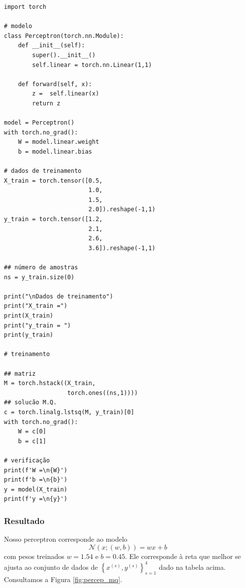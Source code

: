 \begin{lstlisting}[caption=perceptron\_mq.py, label=cap_perceptron_sec_unit:cod:perceptron_mq]
import torch

# modelo
class Perceptron(torch.nn.Module):
    def __init__(self):
        super().__init__()
        self.linear = torch.nn.Linear(1,1)

    def forward(self, x):
        z =  self.linear(x)
        return z

model = Perceptron()
with torch.no_grad():
    W = model.linear.weight
    b = model.linear.bias

# dados de treinamento
X_train = torch.tensor([0.5,
                        1.0,
                        1.5,
                        2.0]).reshape(-1,1)
y_train = torch.tensor([1.2,
                        2.1,
                        2.6,
                        3.6]).reshape(-1,1)

## número de amostras
ns = y_train.size(0)

print("\nDados de treinamento")
print("X_train =")
print(X_train)
print("y_train = ")
print(y_train)

# treinamento

## matriz
M = torch.hstack((X_train,
                  torch.ones((ns,1))))
## solucão M.Q.
c = torch.linalg.lstsq(M, y_train)[0]
with torch.no_grad():
    W = c[0]
    b = c[1]

# verificação
print(f'W =\n{W}')
print(f'b =\n{b}')
y = model(X_train)
print(f'y =\n{y}')
\end{lstlisting}

\subsubsection{Resultado}

Nosso perceptron corresponde ao modelo
\begin{equation}
  \mathcal{N}(x; (w, b)) = wx + b
\end{equation}
com pesos treinados $w = 1.54$ e $b = 0.45$. Ele corresponde à reta que melhor se ajusta ao conjunto de dados de $\left\{x^{(s)}, y^{(s)}\right\}_{s=1}^4$ dado na tabela acima. Consultamos a Figura \ref{fig:percep_mq}.

